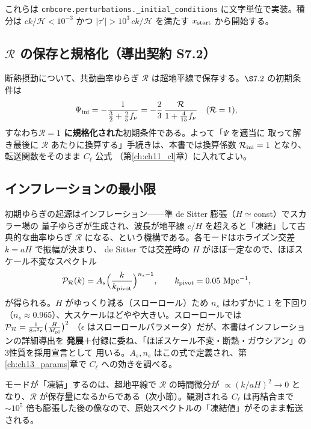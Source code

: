 \begin{numreality}
これらは \texttt{cmbcore.perturbations.\_initial\_conditions} に文字単位で実装。積分は
$ck/\mathcal H<10^{-3}$ かつ $|\tau'|>10^3\,ck/\mathcal H$ を満たす $x_{\rm start}$ から開始する。
\end{numreality}

\subsection{$\mathcal R$ の保存と規格化（導出契約 S7.2）}
断熱摂動について、共動曲率ゆらぎ $\mathcal R$ は超地平線で保存する。$\S7.2$ の初期条件は
\begin{equation}
  \Psi_{\rm ini}=-\frac{1}{\tfrac32+\tfrac25 f_\nu}
  =-\frac{2}{3}\,\frac{\mathcal R}{1+\tfrac{4}{15}f_\nu}\quad(\mathcal R=1),
\end{equation}
すなわち\textbf{$\mathcal R=1$ に規格化された}初期条件である。よって「$\Psi$ を適当に
取って解き最後に $\mathcal R$ あたりに換算する」手続きは、本書では換算係数
$\mathcal R_{\rm ini}=1$ となり、転送関数をそのまま $C_\ell$ 公式
（第\ref{ch:ch11_cl}章）に入れてよい。

\subsection{インフレーションの最小限}
初期ゆらぎの起源はインフレーション——準 de Sitter 膨張（$H\simeq$const）でスカラー場の
量子ゆらぎが生成され、波長が地平線 $c/H$ を超えると「凍結」して古典的な曲率ゆらぎ
$\mathcal R$ になる、という機構である。各モードはホライズン交差 $k=aH$ で振幅が決まり、
de Sitter では交差時の $H$ がほぼ一定なので、ほぼスケール不変なスペクトル
\begin{equation}
  \mathcal P_\mathcal R(k)=A_s\Big(\frac{k}{k_{\rm pivot}}\Big)^{n_s-1},\qquad
  k_{\rm pivot}=0.05~\mathrm{Mpc^{-1}},
  \label{eq:PR}
\end{equation}
が得られる。$H$ がゆっくり減る（スローロール）ため $n_s$ はわずかに $1$ を下回り
（$n_s\approx0.965$）、大スケールほどやや大きい。スローロールでは
$\mathcal P_\mathcal R=\frac{1}{8\pi^2\epsilon}\big(\frac{H}{M_{\rm pl}}\big)^2$
（$\epsilon$ はスローロールパラメータ）だが、本書はインフレーションの詳細導出を
\textbf{発展}＋付録に委ね、「ほぼスケール不変・断熱・ガウシアン」の3性質を採用宣言として
用いる。$A_s,n_s$ はこの式で定義され、第\ref{ch:ch13_params}章で $C_\ell$ への効きを調べる。

\begin{advanced}
モードが「凍結」するのは、超地平線で $\mathcal R$ の時間微分が $\propto(k/aH)^2\to0$ と
なり、$\mathcal R$ が保存量になるからである（次小節）。観測される $C_\ell$ は再結合まで
$\sim10^5$ 倍も膨張した後の像なので、原始スペクトルの「凍結値」がそのまま転送される。
\end{advanced}

